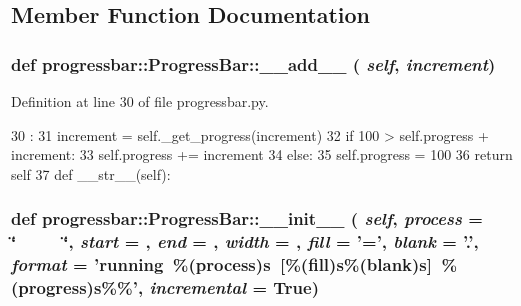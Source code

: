 \subsection{Member Function Documentation}
\hypertarget{classprogressbar_1_1ProgressBar_a1f77ba8c29d99201812d6072c196c442}{
\subsubsection[{\_\-\_\-add\_\-\_\-}]{\setlength{\rightskip}{0pt plus 5cm}def progressbar::ProgressBar::\_\-\_\-add\_\-\_\- ( {\em self}, \/   {\em increment})}}
\label{classprogressbar_1_1ProgressBar_a1f77ba8c29d99201812d6072c196c442}


Definition at line 30 of file progressbar.py.


\begin{DoxyCode}
30                                 :
31         increment = self._get_progress(increment)
32         if 100 > self.progress + increment:
33             self.progress += increment
34         else:
35             self.progress = 100
36         return self
37     
    def __str__(self):
\end{DoxyCode}
\hypertarget{classprogressbar_1_1ProgressBar_a7ad95b3ae7b580117dd48355a3e967ae}{
\subsubsection[{\_\-\_\-init\_\-\_\-}]{\setlength{\rightskip}{0pt plus 5cm}def progressbar::ProgressBar::\_\-\_\-init\_\-\_\- ( {\em self}, \/   {\em process} = {\ttfamily \char`\"{}~~~~~\char`\"{}}, \/   {\em start} = {}, \/   {\em end} = {}, \/   {\em width} = {}, \/   {\em fill} = {\ttfamily '='}, \/   {\em blank} = {\ttfamily '.'}, \/   {\em format} = {\ttfamily 'running~\%({\bf process})s~\mbox{[}\%({\bf fill})s\%({\bf blank})s\mbox{]}~\%({\bf progress})s\%\%'}, \/   {\em incremental} = {\ttfamily True})}}
\label{classprogressbar_1_1ProgressBar_a7ad95b3ae7b580117dd48355a3e967ae}


